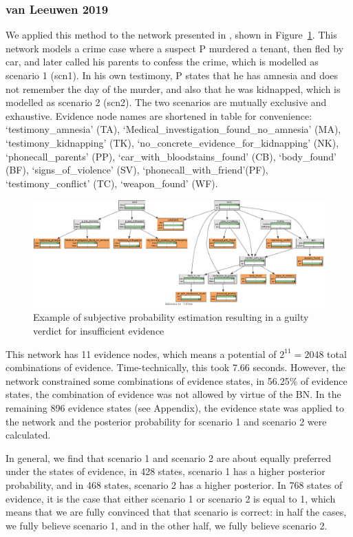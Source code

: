\documentclass[12pt]{article}
\begin{document}
 \subsubsection{van Leeuwen 2019}
We applied this method to the network presented in \citet{vanLeeuwen2019}, shown in Figure~\ref{love}.  This network models a crime case where a suspect P murdered a tenant, then fled by car, and later called his parents to confess the crime, which is modelled as scenario 1 (scn1). In his own testimony, P states that he has amnesia and does not remember the day of the murder, and also that he was kidnapped, which is modelled as scenario 2 (scn2). The two scenarios are mutually exclusive and exhaustive. Evidence node names are shortened in table for convenience: `testimony\_amnesia' (TA), `Medical\_investigation\_found\_no\_amnesia' (MA), `testimony\_kidnapping' (TK), `no\_concrete\_evidence\_for\_kidnapping' (NK), `phonecall\_parents' (PP),  `car\_with\_bloodstains\_found' (CB), `body\_found' (BF), `signs\_of\_violence' (SV), `phonecall\_with\_friend'(PF), `testimony\_conflict' (TC), `weapon\_found' (WF).


\begin{figure}[htbp]
\includegraphics[width=\linewidth]{images/oldnetwork.pdf}
\caption{Example of subjective probability estimation resulting in a guilty verdict for insufficient evidence}
\label{love}
\end{figure}%

This network has 11 evidence nodes, which means a potential of $2^11 = 2048$ total combinations of evidence. Time-technically, this took 7.66 seconds. However, the network constrained some combinations of evidence states, in 56.25\% of evidence states, the combination of evidence was not allowed by virtue of the BN. In the remaining 896 evidence states (see Appendix), the evidence state was applied to the network and the posterior probability for scenario 1 and scenario 2 were calculated.

In general, we find that scenario 1 and scenario 2 are about equally preferred under the states of evidence, in 428 states, scenario 1 has a higher posterior probability, and in 468 states, scenario 2 has a higher posterior. In 768 states of evidence, it is the case that either scenario 1 or scenario 2 is equal to 1, which means that we are fully convinced that that scenario is correct: in half the cases, we fully believe scenario 1, and in the other half, we fully believe scenario 2.
\end{document}
